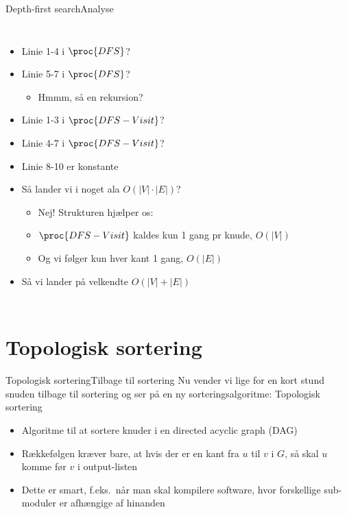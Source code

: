 \documentclass[aspectratio=1610]{beamer}
\begin{document}
\begin{frame}{Depth-first search}{Analyse}
\begin{columns}
        \begin{itemize}
            \item<2-> Linie 1-4 i $\proc{DFS}$? 
            \item<4-> Linie 5-7 i $\proc{DFS}$? 
                \begin{itemize}
                    \item<5-> Hmmm, så en rekursion?
                \end{itemize}
            \item<6-> Linie 1-3 i $\proc{DFS-Visit}$? 
            \item<8-> Linie 4-7 i $\proc{DFS-Visit}$? 
            \item<10-> Linie 8-10 er konstante
            \item<11-> Så lander vi i noget ala $O(|V|\cdot |E|)$?
                \begin{itemize}
                    \item<12-> Nej! Strukturen hjælper os:
                    \item<13-> $\proc{DFS-Visit}$ kaldes kun 1 gang pr knude,
                        $O(|V|)$
                    \item<14-> Og vi følger kun hver kant 1 gang, $O(|E|)$
                \end{itemize}
            \item<15-> Så vi lander på velkendte $O(|V| + |E|)$
        \end{itemize}
        
    
    \end{columns}
\end{frame}


\section{Topologisk sortering}

\begin{frame}{Topologisk sortering}{Tilbage til sortering}
    Nu vender vi lige for en kort stund snuden tilbage til sortering og ser på
    en ny sorteringsalgoritme: \alert{Topologisk sortering}

    \begin{itemize}[<+(1)->]
        \item Algoritme til at sortere knuder i en \alert{directed acyclic
            graph} (DAG)
        \item Rækkefølgen kræver bare, at hvis der er en kant fra $u$ til $v$ i
            $G$, så skal $u$ komme før $v$ i output-listen
        \item Dette er smart, f.eks.\ når man skal kompilere software, hvor
            forskellige sub-moduler er afhængige af hinanden
    \end{itemize}
\end{frame}
\end{document}
